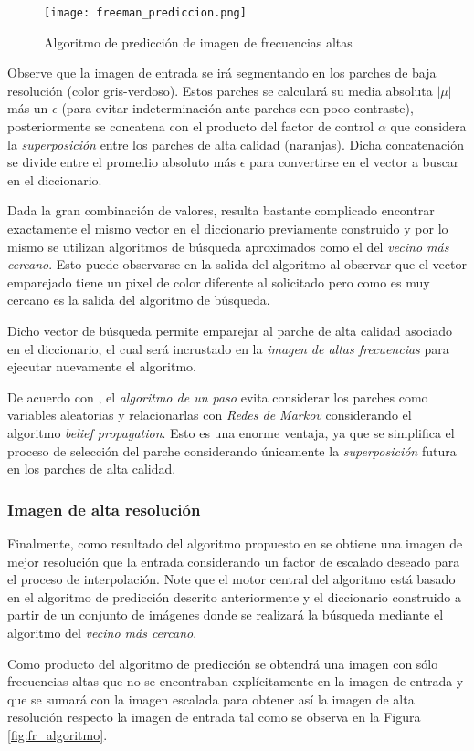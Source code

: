\begin{figure}[H]
    \texttt{[image:  freeman\_prediccion.png]}
    \centering
    \caption{ Algoritmo de predicción de imagen de frecuencias altas }
    \label{fig:fr_prediccion}
\end{figure}

Observe que la imagen de entrada se irá segmentando en los parches de baja 
resolución (color gris-verdoso). Estos parches se calculará su media absoluta 
$|\mu|$ más un $\epsilon$ (para evitar indeterminación ante parches con poco
contraste), posteriormente se concatena con el producto del factor de control 
$\alpha$ que considera la \emph{superposición} entre los parches de alta calidad
(naranjas). Dicha concatenación se divide entre el promedio absoluto más $\epsilon$
para convertirse en el vector a buscar en el diccionario. 

Dada la gran combinación de valores, resulta bastante complicado encontrar 
exactamente el mismo vector en el diccionario previamente construido y por
lo mismo se utilizan algoritmos de búsqueda aproximados como el del \emph{vecino
más cercano}. Esto puede observarse en la salida del algoritmo al observar que el 
vector emparejado tiene un pixel de color diferente al solicitado pero como 
es muy cercano es la salida del algoritmo de búsqueda. 

Dicho vector de búsqueda permite emparejar al parche de alta calidad asociado
en el diccionario, el cual será incrustado en la \emph{imagen de altas frecuencias}
para ejecutar nuevamente el algoritmo. 

De acuerdo con \cite{freeman}, el \emph{algoritmo de un paso} evita considerar
los parches como variables aleatorias y relacionarlas con \emph{Redes de Markov}
considerando el algoritmo \emph{belief propagation}. Esto es una enorme ventaja,
ya que se simplifica el proceso de selección del parche considerando 
únicamente la \emph{superposición} futura en los parches de alta calidad. 

\subsubsection{Imagen de alta resolución}
\noindent
Finalmente, como resultado del algoritmo propuesto en \cite{freeman} se obtiene
una imagen de mejor resolución que la entrada considerando un factor de escalado
deseado para el proceso de interpolación. Note que el motor central del algoritmo
está basado en el algoritmo de predicción descrito anteriormente y el diccionario
construido a partir de un conjunto de imágenes donde se realizará la búsqueda
mediante el algoritmo del \emph{vecino más cercano}. 

Como producto del algoritmo de predicción se obtendrá una imagen con sólo frecuencias
altas que no se encontraban explícitamente en la imagen de entrada y que se sumará
con la imagen escalada para obtener así la imagen de alta resolución respecto
la imagen de entrada tal como se observa en la Figura \ref{fig:fr_algoritmo}.